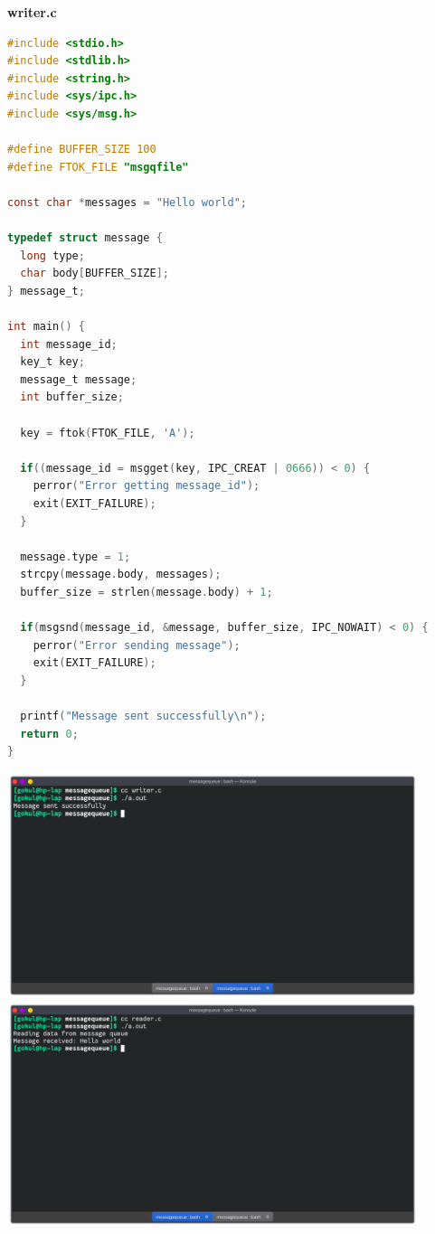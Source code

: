 \textbf{writer.c}
\begin{lstlisting}[language=C]
#include <stdio.h>
#include <stdlib.h>
#include <string.h>
#include <sys/ipc.h>
#include <sys/msg.h>

#define BUFFER_SIZE 100
#define FTOK_FILE "msgqfile"

const char *messages = "Hello world";

typedef struct message {
  long type;
  char body[BUFFER_SIZE];
} message_t;

int main() {
  int message_id;
  key_t key;
  message_t message;
  int buffer_size;

  key = ftok(FTOK_FILE, 'A');

  if((message_id = msgget(key, IPC_CREAT | 0666)) < 0) {
    perror("Error getting message_id");
    exit(EXIT_FAILURE);
  }

  message.type = 1;
  strcpy(message.body, messages);
  buffer_size = strlen(message.body) + 1;

  if(msgsnd(message_id, &message, buffer_size, IPC_NOWAIT) < 0) {
    perror("Error sending message");
    exit(EXIT_FAILURE);
  }

  printf("Message sent successfully\n");
  return 0;
}
\end{lstlisting}

\begin{center}
	\includegraphics[width=0.90\textwidth]{img/p4/ss4.png}
	\includegraphics[width=0.90\textwidth]{img/p4/ss5.png}
\end{center}


